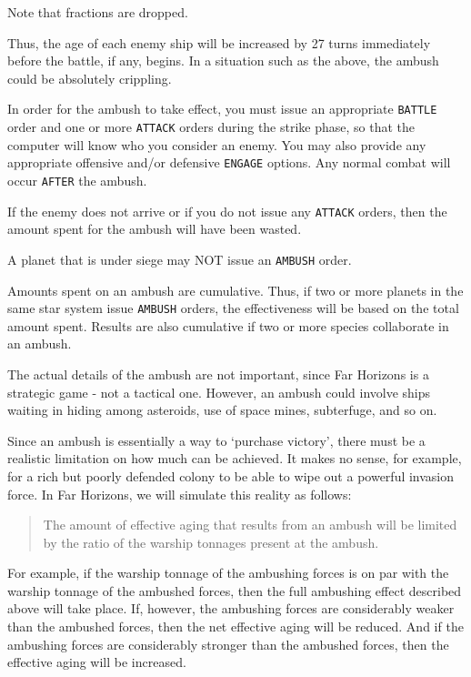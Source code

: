 \documentclass[10pt,titlepage]{article}
\begin{document}
Note that fractions are dropped.

Thus, the age of each enemy ship will be increased by 27 turns immediately
before the battle, if any, begins.  In a situation such as the above, the
ambush could be absolutely crippling.

In order for the ambush to take effect, you must issue an appropriate \texttt{BATTLE}
order and one or more \texttt{ATTACK} orders during the strike phase, so that the
computer will know who you consider an enemy.  You may also provide any
appropriate offensive and/or defensive \texttt{ENGAGE} options.  Any normal combat
will occur \texttt{AFTER} the ambush.

If the enemy does not arrive or if you do not issue any \texttt{ATTACK} orders, then the
amount spent for the ambush will have been wasted.

A planet that is under siege may NOT issue an \texttt{AMBUSH} order.

Amounts spent on an ambush are cumulative.  Thus, if two or more planets in the
same star system issue \texttt{AMBUSH} orders, the effectiveness will be based on the
total amount spent.  Results are also cumulative if two or more species
collaborate in an ambush.

The actual details of the ambush are not important, since Far Horizons is a
strategic game - not a tactical one.  However, an ambush could involve ships
waiting in hiding among asteroids, use of space mines, subterfuge, and so on.

Since an ambush is essentially a way to `purchase victory', there must be a
realistic limitation on how much can be achieved.  It makes no sense, for
example, for a rich but poorly defended colony to be able to wipe out a
powerful invasion force.  In Far Horizons, we will simulate this reality as
follows:

\begin{quotation}
	The amount of effective aging that results from an ambush will
	be limited by the ratio of the warship tonnages present at the
	ambush.
\end{quotation} 

For example, if the warship tonnage of the ambushing forces is on par with
the warship tonnage of the ambushed forces, then the full ambushing effect
described above will take place.  If, however, the ambushing forces are
considerably weaker than the ambushed forces, then the net effective aging
will be reduced.  And if the ambushing forces are considerably stronger than
the ambushed forces, then the effective aging will be increased.
\end{document}
